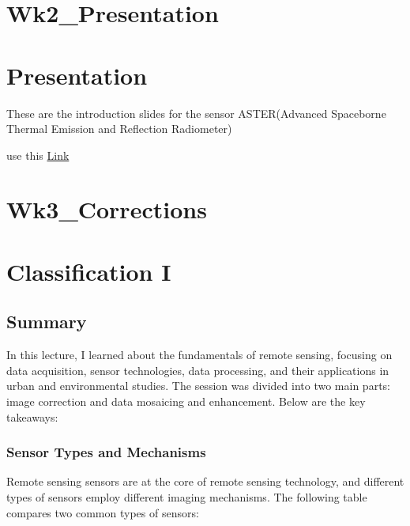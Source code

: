\documentclass[
  letterpaper,
  DIV=11,
  numbers=noendperiod]{scrreprt}
\begin{document}

\chapter{Wk2\_Presentation}\label{wk2_presentation}


\chapter{Presentation}\label{presentation}

These are the introduction slides for the sensor ASTER(Advanced
Spaceborne Thermal Emission and Reflection Radiometer)

use this
\href{https://lydia0930.github.io/CASA0023xaringan/w2-slides.html}{Link}


\chapter{Wk3\_Corrections}\label{wk3_corrections}


\chapter{Classification I}\label{classification-i}

\section{Summary}\label{summary}

In this lecture, I learned about the fundamentals of remote sensing,
focusing on data acquisition, sensor technologies, data processing, and
their applications in urban and environmental studies. The session was
divided into two main parts: image correction and data mosaicing and
enhancement. Below are the key takeaways:

\subsection{Sensor Types and
Mechanisms}\label{sensor-types-and-mechanisms}

Remote sensing sensors are at the core of remote sensing technology, and
different types of sensors employ different imaging mechanisms. The
following table compares two common types of sensors:
\end{document}
